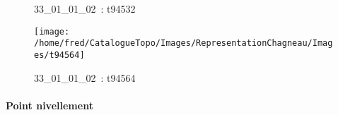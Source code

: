 \documentclass[12pt,titlepage]{book}
\begin{document}
\begin{figure}[h!]
\begin{minipage}[t]{3cm}
\begin{center}
      \caption[~33\_01\_01\_02]{\small{33\_01\_01\_02~:} \tiny{t94532}}\label{t94532}
    \end{center}
  \end{minipage}
  \begin{minipage}[t]{3cm}
    \begin{center}
      \texttt{[image: /home/fred/CatalogueTopo/Images/RepresentationChagneau/Images/t94564]}
      \caption[~33\_01\_01\_02]{\small{33\_01\_01\_02~:} \tiny{t94564}}\label{t94564}
    \end{center}
  \end{minipage}
\end{figure}


\paragraph{Point nivellement}
\noindent
\vspace{\baselineskip}
\end{document}
